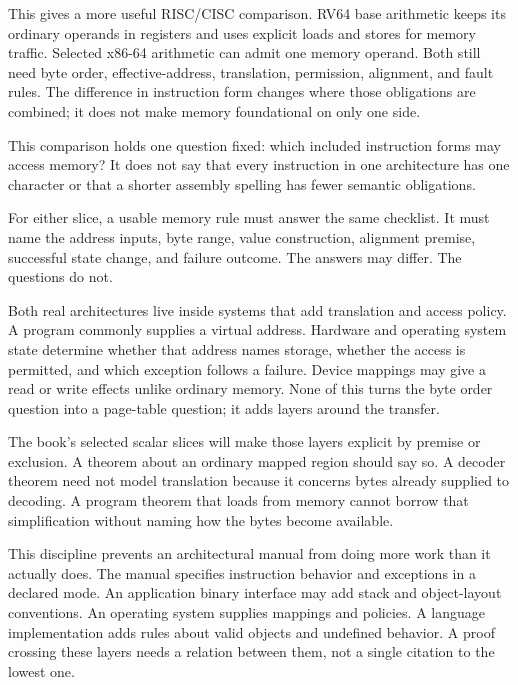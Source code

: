 This gives a more useful RISC/CISC comparison. RV64 base arithmetic keeps its
ordinary operands in registers and uses explicit loads and stores for memory
traffic. Selected x86-64 arithmetic can admit one memory operand. Both still
need byte order, effective-address, translation, permission, alignment, and
fault rules. The difference in instruction form changes where those
obligations are combined; it does not make memory foundational on only one
side.

This comparison holds one question fixed: which included instruction forms
may access memory? It does not say that every instruction in one architecture
has one character or that a shorter assembly spelling has fewer semantic
obligations.

For either slice, a usable memory rule must answer the same checklist. It must
name the address inputs, byte range, value construction, alignment premise,
successful state change, and failure outcome. The answers may differ. The
questions do not.

Both real architectures live inside systems that add translation and access
policy. A program commonly supplies a virtual address. Hardware and operating
system state determine whether that address names storage, whether the access
is permitted, and which exception follows a failure. Device mappings may give
a read or write effects unlike ordinary memory. None of this turns the byte
order question into a page-table question; it adds layers around the transfer.

The book's selected scalar slices will make those layers explicit by premise
or exclusion. A theorem about an ordinary mapped region should say so. A
decoder theorem need not model translation because it concerns bytes already
supplied to decoding. A program theorem that loads from memory cannot borrow
that simplification without naming how the bytes become available.

This discipline prevents an architectural manual from doing more work than it
actually does. The manual specifies instruction behavior and exceptions in a
declared mode. An application binary interface may add stack and object-layout
conventions. An operating system supplies mappings and policies. A language
implementation adds rules about valid objects and undefined behavior. A proof
crossing these layers needs a relation between them, not a single citation to
the lowest one.

